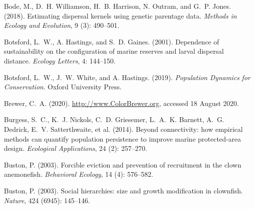 \documentclass[12pt, oneside]{article}   	%
\begin{document}
\begin{thebibliography}{66}
Bode, M., D.~H. Williamson, H.~B. Harrison, N. Outram, and G.~P.
  Jones. (2018).
\newblock Estimating dispersal kernels using genetic parentage data.
\newblock \emph{Methods in Ecology and Evolution}, 9 (3):
  490--501.


Botsford, L.~W., A. Hastings, and S.~D. Gaines. (2001).
\newblock Dependence of sustainability on the configuration of marine reserves
  and larval dispersal distance.
\newblock \emph{Ecology Letters}, 4: 144--150.

Botsford, L.~W., J.~W. White, and A. Hastings. (2019).
\newblock \emph{Population Dynamics for Conservation}.
\newblock Oxford University Press.

Brewer, C.~A. (2020). 
\newblock \url{http://www.ColorBrewer.org},
\newblock accessed 18 August 2020.

Burgess, S.~C., K.~J. Nickols, C.~D. Griesemer, L.~A.~K. Barnett,
  A.~G. Dedrick, E.~V. Satterthwaite, et al. (2014).
\newblock Beyond connectivity: how empirical methods can quantify population
  persistence to improve marine protected-area design.
\newblock \emph{Ecological Applications}, 24 (2): 257--270.

Buston, P. (2003{}).
\newblock Forcible eviction and prevention of recruitment in the clown
  anemonefish.
\newblock \emph{Behavioral Ecology}, 14 (4): 576--582.

Buston, P. (2003{}).
\newblock Social hierarchies: size and growth modification in clownfish.
\newblock \emph{Nature}, 424 (6945): 145--146.


\end{thebibliography}
\end{document}
